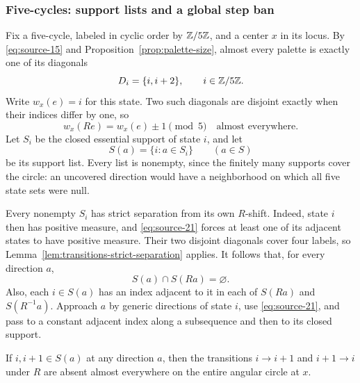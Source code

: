 \subsubsection{Five-cycles: support lists and a global step ban}

Fix a five-cycle, labeled in cyclic order by $\mathbb Z/5\mathbb Z$, and a center
$x$ in its locus.  By \eqref{eq:source-15} and
Proposition~\ref{prop:palette-size}, almost every palette is exactly
one of its diagonals
\[
 D_i=\{i,i+2\},\qquad i\in\mathbb Z/5\mathbb Z.
\]
Write $w_x(e)=i$ for this state.  Two such diagonals are disjoint
exactly when their indices differ by one, so
\begin{equation}
 w_x(Re)=w_x(e)\pm1\pmod5
 \quad\text{almost everywhere}.
 \label{eq:source-21}
\end{equation}
Let $S_i$ be the closed essential support of state $i$, and let
\[
 S(a)=\{i:a\in S_i\}\qquad(a\in S)
\]
be its support list.  Every list is nonempty, since the finitely many
supports cover the circle: an uncovered direction would have a
neighborhood on which all five state sets were null.

Every nonempty $S_i$ has strict separation from its own $R$-shift.
Indeed, state $i$ then has positive measure, and
\eqref{eq:source-21} forces at least one of its adjacent states to
have positive measure.  Their two disjoint diagonals cover four
labels, so Lemma~\ref{lem:transitions-strict-separation} applies.
It follows that, for every direction $a$,
\[
 S(a)\cap S(Ra)=\varnothing.
\]
Also, each $i\in S(a)$ has an index adjacent to it in each of
$S(Ra)$ and $S(R^{-1}a)$.  Approach $a$ by generic directions of
state $i$, use \eqref{eq:source-21}, and pass to a constant adjacent
index along a subsequence and then to its closed support.

\begin{lemma}
\label{lem:transitions-step-ban}
If $i,i+1\in S(a)$ at any direction $a$, then the transitions
$i\to i+1$ and $i+1\to i$ under $R$ are absent almost everywhere
on the entire angular circle at $x$.
\end{lemma}

